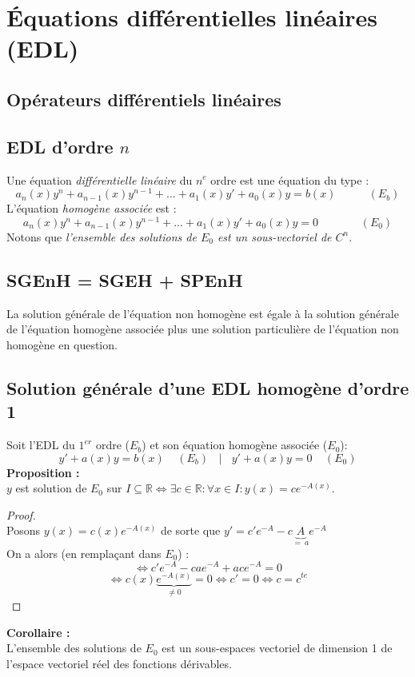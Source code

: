 \documentclass[11pt, a4paper, openany]{book}
\begin{document}
\section{Équations différentielles linéaires (EDL)}
\subsection{Opérateurs différentiels linéaires}
\subsection{EDL d'ordre $n$}
Une équation \textit{différentielle linéaire} du $n^e$ ordre est une équation du type : 
$$a_n(x)y^n + a_{n-1}(x)y^{n-1} + ... + a_1(x)y' + a_0(x)y = b(x)\ \ \ \ \ \ \ \ \ \ \ \ \ (E_b)$$
L'équation \textit{homogène associée} est : 
$$a_n(x)y^n + a_{n-1}(x)y^{n-1} + ... + a_1(x)y' + a_0(x)y = 0\ \ \ \ \ \ \ \ \ \ \ \ \ \ \ \ \ (E_0)$$
Notons que \textit{l'ensemble des solutions de $E_0$ est un sous-vectoriel de $C^n$}.

\subsection{SGEnH = SGEH + SPEnH}
La solution générale de l'équation non homogène est égale à la solution générale de l'équation homogène associée plus une solution particulière de l'équation non homogène en question.

\subsection{Solution générale d'une EDL homogène d'ordre 1}
Soit l'EDL du $1^{er}$ ordre ($E_b$) et son équation homogène associée ($E_0$):
$$y' + a(x)y = b(x)\ \ \ \ \ (E_b)\ \ \ \ |\ \ \ \ y' + a(x)y = 0\ \ \ \ \ (E_0)$$
\textbf{Proposition :}\\
$y$ est solution de $E_0$ sur $I \subseteq \mathbb{R} \Leftrightarrow \exists c \in \mathbb{R} : \forall x \in I : y(x) = ce^{-A(x)}$.
\begin{proof}
	\ \\
	Posons $y(x) = c(x)e^{-A(x)}$ de sorte que $y' = c'e^{-A} - c\underbrace{A}_{=\ a}e^{-A}$\\
	On a alors (en remplaçant dans $E_0$)  :\\
	$$\Leftrightarrow c'e^{-A} - cae^{-A} + ace^{-A} = 0$$
	$$\Leftrightarrow c(x)\underbrace{e^{-A(x)}}_{\neq 0} = 0 \Leftrightarrow c' = 0 \Leftrightarrow c = c^{te}$$
\end{proof}
\textbf{Corollaire :}\\
L'ensemble des solutions de $E_0$ est un sous-espaces vectoriel de dimension 1 de l'espace vectoriel réel des fonctions dérivables.
\end{document}
